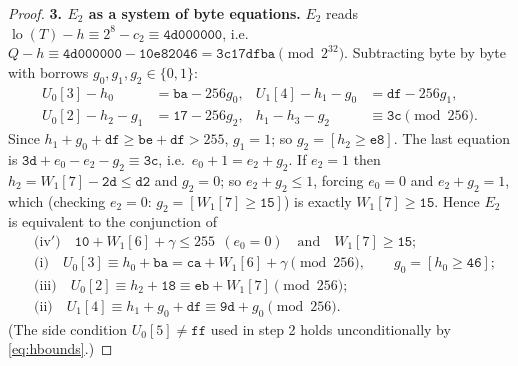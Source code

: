 \begin{proof}
\textbf{3. $E_2$ as a system of byte equations.}
$E_2$ reads $\operatorname{lo}(T)-h\equiv 2^{8}-c_2\equiv\mathtt{4d000000}$, i.e.\
$Q-h\equiv\mathtt{4d000000}-\mathtt{10e82046}=\mathtt{3c17dfba}\pmod{2^{32}}$.
Subtracting byte by byte with borrows $g_0,g_1,g_2\in\{0,1\}$:
\begin{align*}
U_0[3]-h_0&=\mathtt{ba}-256g_0, & U_1[4]-h_1-g_0&=\mathtt{df}-256g_1,\\
U_0[2]-h_2-g_1&=\mathtt{17}-256g_2, & h_1-h_3-g_2&\equiv\mathtt{3c}\pmod{256}.
\end{align*}
Since $h_1+g_0+\mathtt{df}\ge\mathtt{be}+\mathtt{df}>255$, $g_1=1$; so $g_2=[h_2\ge\mathtt{e8}]$.
The last equation is $\mathtt{3d}+e_0-e_2-g_2\equiv\mathtt{3c}$, i.e.\ $e_0+1=e_2+g_2$.
If $e_2=1$ then $h_2=W_1[7]-\mathtt{2d}\le\mathtt{d2}$ and $g_2=0$; so $e_2+g_2\le1$, forcing $e_0=0$ and
$e_2+g_2=1$, which (checking $e_2=0$: $g_2=[W_1[7]\ge\mathtt{15}]$) is exactly $W_1[7]\ge\mathtt{15}$.
Hence $E_2$ is equivalent to the conjunction of
\begin{align}
&\text{(iv$'$)}\quad \mathtt{10}+W_1[6]+\gamma\le255\ \ (e_0=0)\quad\text{and}\quad W_1[7]\ge\mathtt{15};\label{eq:iv}\\
&\text{(i)}\quad U_0[3]\equiv h_0+\mathtt{ba}=\mathtt{ca}+W_1[6]+\gamma\pmod{256},\qquad g_0=[h_0\ge\mathtt{46}];\label{eq:i}\\
&\text{(iii)}\quad U_0[2]\equiv h_2+\mathtt{18}\equiv\mathtt{eb}+W_1[7]\pmod{256};\label{eq:iii}\\
&\text{(ii)}\quad U_1[4]\equiv h_1+g_0+\mathtt{df}\equiv\mathtt{9d}+g_0\pmod{256}.\label{eq:ii}
\end{align}
(The side condition $U_0[5]\ne\mathtt{ff}$ used in step 2 holds unconditionally by \eqref{eq:hbounds}.)


\end{proof}
